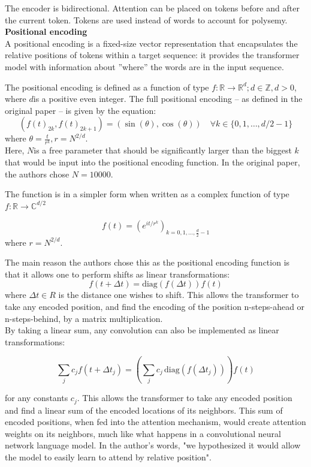 The encoder is bidirectional. Attention can be placed on tokens before and after the current token. Tokens are used instead of words to account for polysemy.
\\

\textbf{Positional encoding}\\
A positional encoding is a fixed-size vector representation that encapsulates the relative positions of tokens within a target sequence: it provides the transformer model with information about ''where'' the words are in the input sequence.

The positional encoding is defined as a function of type \(f: \mathbb{R} \to \mathbb{R}^d; d \in \mathbb{Z}, d > 0\), where \(d\)is a positive even integer. The full positional encoding – as defined in the original paper – is given by the equation:
\[(f(t)_{2k}, f(t)_{2k+1}) = (\sin(\theta), \cos(\theta)) \quad \forall k \in \{0, 1, \ldots, d/2 - 1\}\]
where \(\theta = \frac{t}{r^k}, r = N^{2/d}\).\\

Here, \(N\)is a free parameter that should be significantly larger than the biggest \(k\)that would be input into the positional encoding function. In the original paper, the authors chose \(N=10000\).

The function is in a simpler form when written as a complex function of type
\(f: \mathbb{R} \to \mathbb C^{d/2}\)

\[f(t) = \left(e^{it/r^k}\right)_{k=0, 1, \ldots, \frac d 2 - 1}\] 
where \(r = N^{2/d}\).

The main reason the authors chose this as the positional encoding function is that it allows one to perform shifts as linear transformations:
\[f(t + \Delta t) = \mathrm{diag}(f(\Delta t)) f(t)\]
where \(\Delta t \in R\) is the distance one wishes to shift. This allows the transformer to take any encoded position, and find the encoding of the position n-steps-ahead or n-steps-behind, by a matrix multiplication.
\\

By taking a linear sum, any convolution can also be implemented as linear transformations:

\[\sum_j c_j f(t + \Delta t_j) = \left(\sum_j c_j \,\mathrm{diag}(f(\Delta t_j))\right) f(t)\]

for any constants \(c_j\). This allows the transformer to take any encoded position and find a linear sum of the encoded locations of its neighbors. This sum of encoded positions, when fed into the attention mechanism, would create attention weights on its neighbors, much like what happens in a convolutional neural network language model. In the author's words, "we hypothesized it would allow the model to easily learn to attend by relative position".
\\

